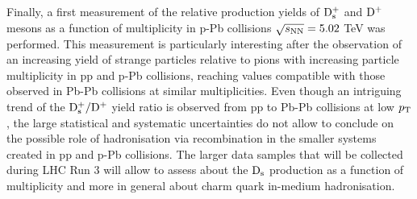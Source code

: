 Finally, a first measurement of the relative production yields of ${\rm D_s^+}$ and ${\rm D^+}$ mesons as a function of 
multiplicity in p-Pb collisions $\sqrt{s_{\rm NN}}=5.02$ TeV was performed. This measurement is particularly interesting
after the observation of an increasing yield of strange particles relative to pions with increasing particle multiplicity 
in pp and p-Pb collisions, reaching values compatible with those observed in Pb-Pb collisions at similar multiplicities. 
Even though an intriguing trend of the ${\rm D_s^+}/{\rm D^+}$ yield ratio is observed from pp to Pb-Pb 
collisions at low $p_{\rm T}$, the large statistical and systematic uncertainties do not allow to conclude 
on the possible role of hadronisation via recombination in the smaller systems created in pp and p-Pb collisions. 
The larger data samples that will be collected during LHC Run 3 will allow to assess about
the ${\rm D_s}$ production as a function of multiplicity and more in general about charm quark in-medium hadronisation.



